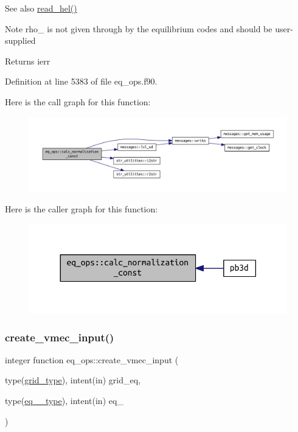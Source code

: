 \begin{DoxySeeAlso}{See also}
\hyperlink{namespacehelena__ops_ae05ba1182eb002d93c27ca4ff7ab8cf2}{read\+\_\+hel()}
\end{DoxySeeAlso}
\begin{DoxyNote}{Note}
{\ttfamily rho\+\_} is not given through by the equilibrium codes and should be user-\/supplied
\end{DoxyNote}
\begin{DoxyReturn}{Returns}
ierr 
\end{DoxyReturn}


Definition at line 5383 of file eq\+\_\+ops.\+f90.

Here is the call graph for this function\+:\nopagebreak
\begin{figure}[H]
\begin{center}
\leavevmode
\includegraphics[width=350pt]{namespaceeq__ops_a7cd38586e386e1bc684a327ebcc4c1de_cgraph}
\end{center}
\end{figure}
Here is the caller graph for this function\+:\nopagebreak
\begin{figure}[H]
\begin{center}
\leavevmode
\includegraphics[width=330pt]{namespaceeq__ops_a7cd38586e386e1bc684a327ebcc4c1de_icgraph}
\end{center}
\end{figure}
\mbox{\label{namespaceeq__ops_a9addef683b3d4a8c587510e4c994ec61}} 
\subsubsection{\texorpdfstring{create\+\_\+vmec\+\_\+input()}{create\_vmec\_input()}}
{\footnotesize\ttfamily integer function eq\+\_\+ops\+::create\+\_\+vmec\+\_\+input (\begin{DoxyParamCaption}\item[{type(\hyperlink{structgrid__vars_1_1grid__type}{grid\+\_\+type}), intent(in)}]{grid\+\_\+eq,  }\item[{type(\hyperlink{structeq__vars_1_1eq__1__type}{eq\+\_\+1\+\_\+type}), intent(in)}]{eq\+\_ }\end{DoxyParamCaption})}



